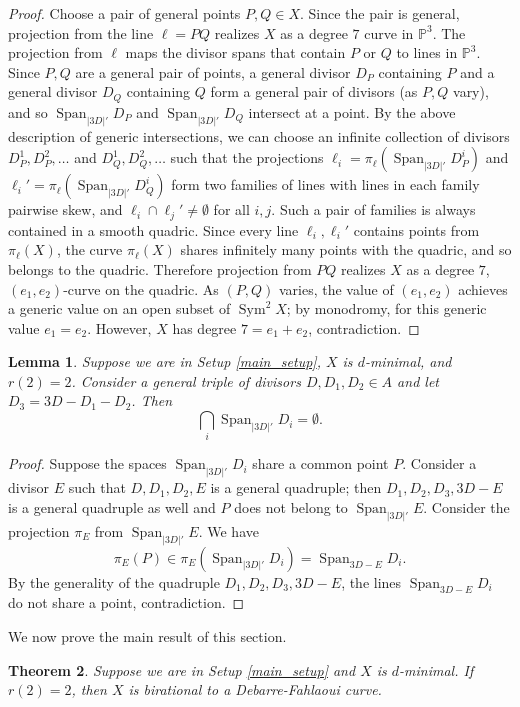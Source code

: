 \documentclass[11pt]{amsart}
\newcommand{\PP}{\mathbb{P}}
\DeclareMathOperator{\Sym}{Sym}
\newcommand{\Span}{\operatorname{Span}}
\newtheorem{theorem}{Theorem}[section]
\newtheorem{lemma}[theorem]{Lemma}
\theoremstyle{definition}
\theoremstyle{remark}
\begin{document}
\begin{proof}
Choose a pair of general points $P,Q \in X$. Since the pair is general, projection from the line $\ell=PQ$ realizes $X$ as a degree $7$ curve in $\PP^3$. The projection from $\ell$ maps the divisor spans that contain $P$ or $Q$ to lines in $\PP^3$. Since $P,Q$ are a general pair of points, a general divisor $D_P$ containing $P$ and a general divisor $D_Q$ containing $Q$ form a general pair of divisors (as $P,Q$ vary), and so $\Span_{|3D|'} D_P$ and $\Span_{|3D|'} D_Q$ intersect at a point. By the above description of generic intersections, we can choose an infinite collection of divisors $D_{P}^{1}, D_P^2, \dots$ and $D_Q^{1}, D_Q^{2}, \dots$ such that the projections $\ell_i=\pi_\ell(\Span_{|3D|'}D_P^i)$ and $\ell_i'=\pi_{\ell}(\Span_{|3D|'}D_Q^i)$ form two families of lines with lines in each family pairwise skew, and $\ell_i \cap \ell_j' \neq \emptyset$ for all $i,j$. Such a pair of families is always contained in a smooth quadric.  Since every line $\ell_i, \ell_i'$ contains points from $\pi_\ell(X)$, the curve $\pi_\ell(X)$ shares infinitely many points with the quadric, and so belongs to the quadric. Therefore projection from $PQ$ realizes $X$ as a degree $7$, $(e_1, e_2)$-curve on the quadric. As $(P,Q)$ varies, the value of $(e_1, e_2)$ achieves a generic value on an open subset of $\Sym^2 X$; by monodromy, for this generic value $e_1=e_2$. However, $X$ has degree $7=e_1+e_2$, contradiction.
\end{proof} 


\begin{lemma}\label{lem:generically-not-in-hyperplane}
Suppose we are in Setup \ref{main_setup}, $X$ is $d$-minimal, and $r(2)=2$. Consider a general triple of divisors $D, D_1, D_2 \in A$ and let $D_3=3D-D_1-D_2$. Then \[\bigcap_i \Span_{|3D|'} D_i = \emptyset.\]
\end{lemma}
\begin{proof}
Suppose the spaces $\Span_{|3D|'} D_i$ share a common point $P$. Consider a divisor $E$ such that $D, D_1, D_2, E$ is a general quadruple; then $D_1, D_2, D_3, 3D-E$ is a general quadruple as well and $P$ does not belong to $\Span_{|3D|'} E$. Consider the projection $\pi_E$ from $\Span_{|3D|'}E$. We have \[\pi_E(P) \in \pi_E(\Span_{|3D|'}D_i)=\Span_{3D-E} D_i.\] By the generality of the quadruple $D_1, D_2, D_3, 3D-E$, the lines $\Span_{3D-E} D_i$ do not share a point, contradiction. 
\end{proof}


We now prove the main result of this section.
\begin{theorem}\label{thm:main-debarre-fahlaoui}
Suppose we are in Setup \ref{main_setup} and $X$ is $d$-minimal. If $r(2) =2$, then $X$ is birational to a Debarre-Fahlaoui curve.
\end{theorem}
\end{document}
